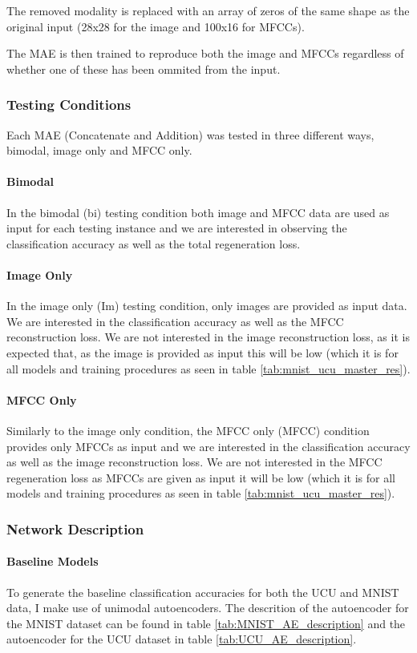 The removed modality is replaced with an array of zeros of the same shape as the original input (28x28 for the image and 100x16 for MFCCs).

The MAE is then trained to reproduce both the image and MFCCs regardless of whether one of these has been ommited from the input.

\subsubsection{Testing Conditions}
Each MAE (Concatenate and Addition) was tested in three different ways, bimodal, image only and MFCC only.

\paragraph{Bimodal}
In the bimodal (bi) testing condition both image and MFCC data are used as input for each testing instance and we are interested in observing the classification accuracy as well as the total regeneration loss.

\paragraph{Image Only}
In the image only (Im) testing condition, only images are provided as input data. We are interested in the classification accuracy as well as the MFCC reconstruction loss. We are not interested in the image reconstruction loss, as it is expected that, as the image is provided as input this will be low (which it is for all models and training procedures as seen in table \ref{tab:mnist_ucu_master_res}).  

\paragraph{MFCC Only}
Similarly to the image only condition, the MFCC only (MFCC) condition provides only MFCCs as input and we are interested in the classification accuracy as well as the image reconstruction loss. We are not interested in the MFCC regeneration loss as MFCCs are given as input it will be low (which it is for all models and training procedures as seen in table \ref{tab:mnist_ucu_master_res}).  

\subsubsection{Network Description}
\paragraph{Baseline Models}
To generate the baseline classification accuracies for both the UCU and MNIST data, I make use of unimodal autoencoders. The descrition of the autoencoder for the MNIST dataset can be found in table \ref{tab:MNIST_AE_description} and the autoencoder for the UCU dataset in table \ref{tab:UCU_AE_description}.

